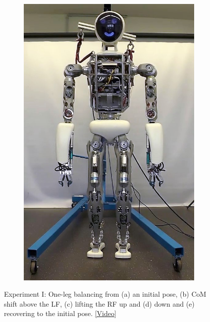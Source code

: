 \begin{figure}[h!]
\begin{subfigure}{.2\textwidth}
	\includegraphics[width=.95\linewidth]{experiments/balancing/snaps/5}
	\caption{}
	\end{subfigure}%
\caption[Experiment I: One-leg balancing]{Experiment I: One-leg balancing from (a) an initial pose, (b) \gls{CoM} shift above the \gls{LF}, (c) lifting the \gls{RF} up and (d) down and (e) recovering to the initial pose. \href{https://github.com/julesser/ma-thesis-experimental-results/blob/master/balancing/balancing.mp4}{[Video]}} 
\label{exp:balancingSnaps}
\end{figure} 

